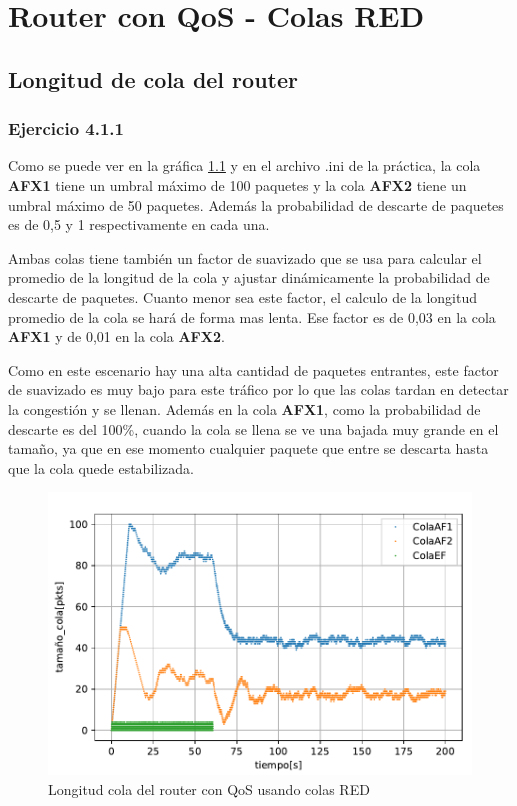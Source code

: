 \chapter{Router con QoS - Colas RED}
\label{chap:colasRED}

\section{Longitud de cola del router}

\subsection{Ejercicio 4.1.1} \label{chap:ejercicio411}
Como se puede ver en la gráfica \ref{fig:colasRED_tam} y en el archivo .ini de la práctica, la cola \textbf{AFX1} tiene un umbral máximo de 100 paquetes y la cola
\textbf{AFX2} tiene un umbral máximo de 50 paquetes. Además la probabilidad de descarte de paquetes es de 0,5 y 1 respectivamente en cada una.

Ambas colas tiene también un factor de suavizado que se usa para calcular el promedio de la longitud de la cola y ajustar dinámicamente la probabilidad
de descarte de paquetes. Cuanto menor sea este factor, el calculo de la longitud promedio de la cola se hará de forma mas lenta. 
Ese factor es de 0,03 en la cola \textbf{AFX1} y de 0,01 en la cola \textbf{AFX2}.

Como en este escenario hay una alta cantidad de paquetes entrantes, este factor de suavizado es muy bajo para este tráfico por lo que las colas tardan en detectar
la congestión y se llenan. Además en la cola \textbf{AFX1}, como la probabilidad de descarte es del 100\%, cuando la cola se llena se ve una
bajada muy grande en el tamaño, ya que en ese momento cualquier paquete que entre se descarta hasta que la cola quede estabilizada. 


\begin{figure}[!ht]
    \centering
    \includegraphics{graficas/RED/tamao_cola_red.pdf}
    \caption{Longitud cola del router con QoS usando colas RED}
    \label{fig:colasRED_tam}
\end{figure}


